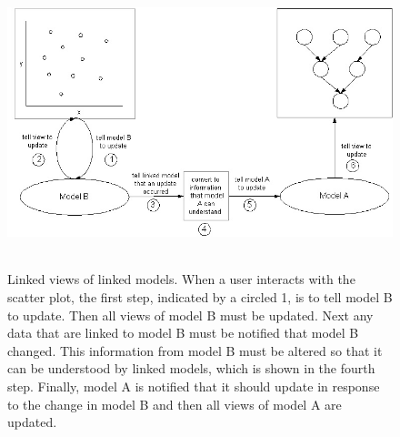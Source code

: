 \documentclass[11pt]{article}
\newcommand{\Robject}[1]{{\texttt{#1}}}
\begin{document}
\begin{figure}[ht]
  \begin{center}
    \includegraphics[height=3.3in, width=6in]{firstMessagePassing.jpg}
    \caption{ Linked views of linked models.  When a user interacts with
      the scatter plot, the first step, indicated by a circled 1,
      is to tell model B to update.  Then all views of model B must be
      updated.  Next any data that are linked to model B must be notified
      that model B changed.  This information from model B must be
      altered so that it can be understood by linked models, which is shown
      in the fourth step.  Finally, model A is notified that it should
      update in response to the change in model B and then all views of
      model A are updated. }
    \label{Fig:firstMP}
  \end{center}
\end{figure}


\end{document}
